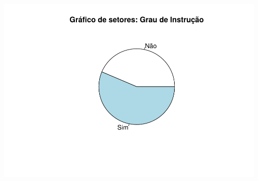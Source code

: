 \documentclass[]{article}
\begin{document}
\includegraphics{Dados_Binários1_files/figure-latex/unnamed-chunk-5-1.pdf}
\end{document}
